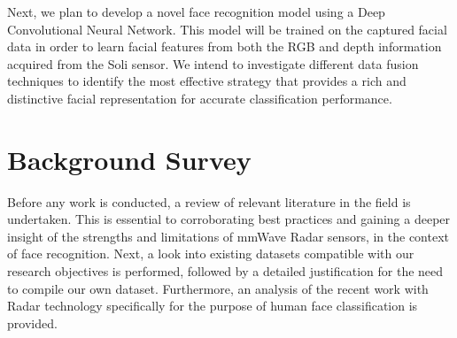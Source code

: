 \documentclass{interim}
\begin{document}
Next, we plan to develop a novel face recognition model using a Deep Convolutional Neural Network. This model will be trained on the captured facial data in order to learn facial features from both the RGB and depth information acquired from the Soli sensor. We intend to investigate different data fusion techniques to identify the most effective strategy that provides a rich and distinctive facial representation for accurate classification performance. 




\section{Background Survey}
Before any work is conducted, a review of relevant literature in the field is undertaken. This is essential to corroborating best practices and gaining a deeper insight of the strengths and limitations of mmWave Radar sensors, in the context of face recognition. Next, a look into existing datasets compatible with our research objectives is performed, followed by a detailed justification for the need to compile our own dataset. Furthermore, an analysis of the recent work with Radar technology specifically for the purpose of human face classification is provided.
\end{document}
